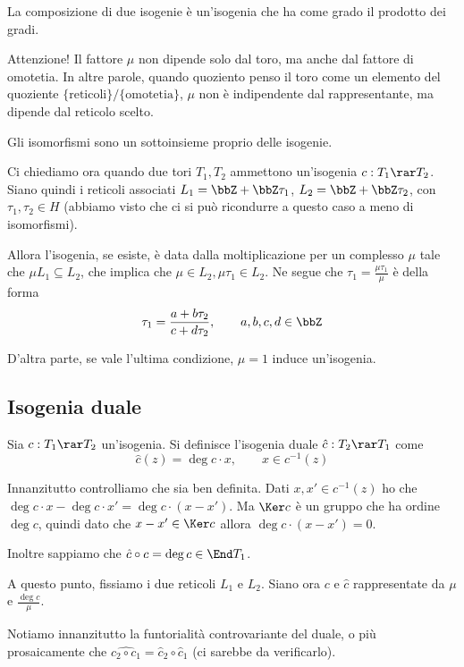 	\begin{osservazione}
		La composizione di due isogenie è un'isogenia che ha come grado il prodotto dei gradi.
	\end{osservazione}
	
	Attenzione! Il fattore $\mu$ non dipende solo dal toro, ma anche dal fattore di omotetia. In altre parole, quando quoziento penso il toro come un elemento del quoziente $\{ \mbox{reticoli} \} / \{ \mbox{omotetia} \}$, $\mu$ non è indipendente dal rappresentante, ma dipende dal reticolo scelto.
	
	\begin{osservazione} 
		Gli isomorfismi sono un sottoinsieme proprio delle isogenie.
	\end{osservazione}

	Ci chiediamo ora quando due tori $T_1, T_2$ ammettono un'isogenia $c: T_1 \rar T_2$. Siano quindi i reticoli associati $L_1=\bbZ + \bbZ \tau_1$, $L_2=\bbZ + \bbZ \tau_2$, con $\tau_1,\tau_2 \in H$ (abbiamo visto che ci si può ricondurre a questo caso a meno di isomorfismi).
	
	Allora l'isogenia, se esiste, è data dalla moltiplicazione per un complesso $\mu$ tale che $\mu L_1 \subseteq L_2$, che implica che $\mu \in L_2, \mu\tau_1 \in L_2$. Ne segue che $\tau_1 = \frac{\mu\tau_1}{\mu}$ è della forma 
	\[
		\tau_1 = \frac{a + b\tau_2}{c+d\tau_2}, \qquad a,b,c,d \in \bbZ
	\]
	
	D'altra parte, se vale l'ultima condizione, $\mu=1$ induce un'isogenia.


	\subsection{Isogenia duale}
	
	Sia $c: T_1 \rar T_2$ un'isogenia. Si definisce l'isogenia duale $\hat c: T_2 \rar T_1$ come 
	\[
		\hat c(z) = \deg c\cdot x, \qquad x \in c^{-1}(z)
	\]
	
	Innanzitutto controlliamo che sia ben definita. Dati $x, x' \in c^{-1}(z)$ ho che $\deg c \cdot x - \deg c \cdot x' = \deg c \cdot (x-x')$. Ma $\Ker c$ è un gruppo che ha ordine $\deg c$, quindi dato che $x-x' \in \Ker c$ allora $\deg c \cdot (x-x') = 0$.
	
	Inoltre sappiamo che $\hat c \circ c = \deg c \in \End T_1$.
	
	A questo punto, fissiamo i due reticoli $L_1$ e $L_2$. Siano ora $c$ e $\hat c$ rappresentate da $\mu$ e $\frac{\deg c}\mu$.
	
	
	Notiamo innanzitutto la funtorialità controvariante del duale, o più prosaicamente che $\hat{c_2 \circ c_1} = \hat c_2 \circ \hat c_1$ (ci sarebbe da verificarlo).

